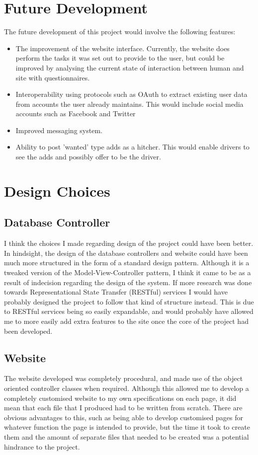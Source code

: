 \section{Future Development}
The future development of this project would involve the following features:

\begin{itemize}
\item The improvement of the website interface. Currently, the website does perform the tasks it was set out to provide to the user, but could be improved by analysing the current state of interaction between human and site with questionnaires.
\item Interoperability using protocols such as OAuth to extract existing user data from accounts the user already maintains. This would include social media accounts such as Facebook\cite{facebook} and Twitter\cite{twitter}
\item Improved messaging system.
\item Ability to post 'wanted' type adds as a hitcher. This would enable drivers to see the adds and possibly offer to be the driver.
\end{itemize}

\section{Design Choices}
\subsection{Database Controller}
I think the choices I made regarding design of the project could have been better. In hindsight, the design of the database controllers and website could have been much more structured in the form of a standard design pattern. Although it is a tweaked version of the Model-View-Controller pattern, I think it came to be as a result of indecision regarding the design of the system. If more research was done towards Representational State Transfer (RESTful) services I would have probably designed the project to follow that kind of structure instead. This is due to RESTful services being so easily expandable, and would probably have allowed me to more easily add extra features to the site once the core of the project had been developed.

\subsection{Website}
The website developed was completely procedural, and made use of the object oriented controller classes when required. Although this allowed me to develop a completely customised website to my own specifications on each page, it did mean that each file that I produced had to be written from scratch. There are obvious advantages to this, such as being able to develop customised pages for whatever function the page is intended to provide, but the time it took to create them and the amount of separate files that needed to be created was a potential hindrance to the project.

